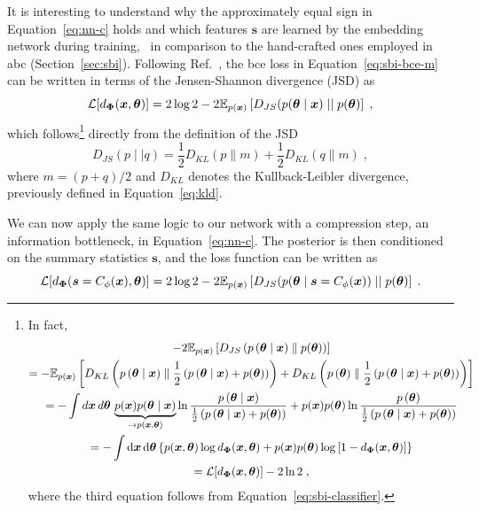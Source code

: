 It is interesting to understand why the approximately equal sign in Equation~\eqref{eq:nn-c} holds and which features $\boldsymbol{s}$ are learned by the embedding network during training, \eg~in comparison to the hand-crafted ones employed in \gls*{abc} (Section~\ref{sec:sbi}). Following Ref.~\cite{Cole:2021gwr}, the \gls*{bce} loss in Equation~\eqref{eq:sbi-bce-m} can be written in terms of the Jensen-Shannon divergence (JSD) as
\begin{equation}
   \mathcal{L}[d_{\bm{\Phi}}(\bm{x}, \bm{\theta})] = 2 \log2 - 2\mathbb{E}_{p(\bm{x})}\left[D_{JS}(p(\bm{\theta}\mid\bm{x})\mid\mid p(\bm{\theta})\right] \;,
\end{equation}
which follows\footnote{
   In fact,
   \begin{multline}
   -2\mathbb{E}_{p(\bm{x})}\left[D_{JS}\left(p\left(\bm{\theta}\mid\bm{x}\right) \parallel  p(\bm{\theta})\right)\right] \\
   =-\mathbb{E}_{p(\bm{x})}\left[
      D_{KL}\left(p\left(\bm{\theta}\mid\bm{x}\right) \parallel \frac12\left(p\left(\bm{\theta}\mid\bm{x}\right) + p(\bm{\theta})\right)\right)
      +D_{KL}\left(p\left(\bm{\theta}\right) \parallel \frac12\left(p\left(\bm{\theta}\mid\bm{x}\right) + p(\bm{\theta})\right)\right)\right]\\
   = -\int d\bm{x}\, d\bm{\theta}\,
   \underbrace{p(\bm{x})p(\bm{\theta}\mid\bm{x})}_{\to p(\bm{x}, \bm{\theta})} \ln \frac{p\left(\bm{\theta}\mid\bm{x}\right) }{ \frac12\left(p\left(\bm{\theta}\mid\bm{x}\right) + p(\bm{\theta})\right)}
   +p(\bm{x})p(\bm{\theta}) \ln \frac{p\left(\bm{\theta}\right) }{ \frac12\left(p\left(\bm{\theta}\mid\bm{x}\right) + p(\bm{\theta})\right)}\\
   = -\int \dd{\ensuremath{\bm{x}}} \dd{\ensuremath{\bm{\theta}}} \left\{ p(\bm{x}, \bm{\theta}) \log d_{\bm{\Phi}}(\bm{x}, \bm{\theta}) \notag + p(\bm{x}) p(\bm{\theta}) \log\left[ 1 - d_{\bm{\Phi}}(\bm{x}, \bm{\theta}) \right] \right\} \\
   = \mathcal{L}[d_{\bm{\Phi}}(\bm{x}, \bm{\theta})] - 2\ln 2 \;,
\end{multline}
where the third equation follows from Equation~\eqref{eq:sbi-classifier}.
}
directly from the definition of the JSD
\begin{equation}
    D_{JS}(p\mid\mid q) = \frac{1}{2}D_{KL}(p \parallel m)+\frac{1}{2}D_{KL}(q \parallel m)\;,
\end{equation}
where $m=(p+q)/2$ and $D_{KL}$ denotes the Kullback-Leibler divergence, previously defined in Equation~\eqref{eq:kld}.

We can now apply the same logic to our network with a compression step, an information bottleneck, in Equation~\eqref{eq:nn-c}. The posterior is then conditioned on the summary statistics $\boldsymbol{s}$, and the loss function can be written as
\begin{equation} \label{eq:loss-jsd}
   \mathcal{L}[d_{\bm{\Phi}}(\boldsymbol{s} = C_\phi(\bm{x}), \bm{\theta})] = 2 \log2 - 2\mathbb{E}_{p(\bm{x})}\left[D_{JS}(p(\bm{\theta}\mid\boldsymbol{s} = C_\phi(\bm{x}))\mid\mid p(\bm{\theta})\right] \;.
\end{equation}

